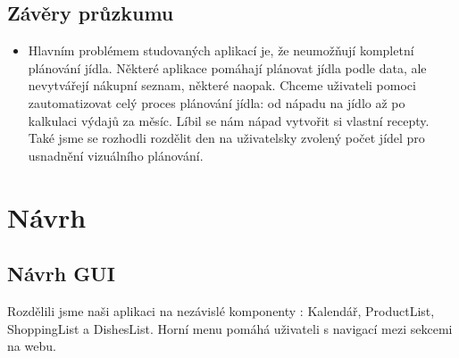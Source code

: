 \documentclass[a4paper,12pt]{article}
\begin{document}
\subsection*{Závěry průzkumu}
\begin{itemize}
    \item Hlavním problémem studovaných aplikací je, že neumožňují kompletní plánování jídla. Některé aplikace pomáhají plánovat jídla podle data, ale nevytvářejí nákupní seznam, některé naopak. Chceme uživateli pomoci zautomatizovat celý proces plánování jídla: od nápadu na jídlo až po kalkulaci výdajů za měsíc. Líbil se nám nápad vytvořit si vlastní recepty. Také jsme se rozhodli rozdělit den na uživatelsky zvolený počet jídel pro usnadnění vizuálního plánování.
\end{itemize}


\section*{Návrh}
\subsection*{Návrh GUI}
 Rozdělili jsme naši aplikaci na nezávislé komponenty : Kalendář, ProductList, ShoppingList a DishesList. Horní menu pomáhá uživateli s navigací mezi sekcemi na webu.
\end{document}
